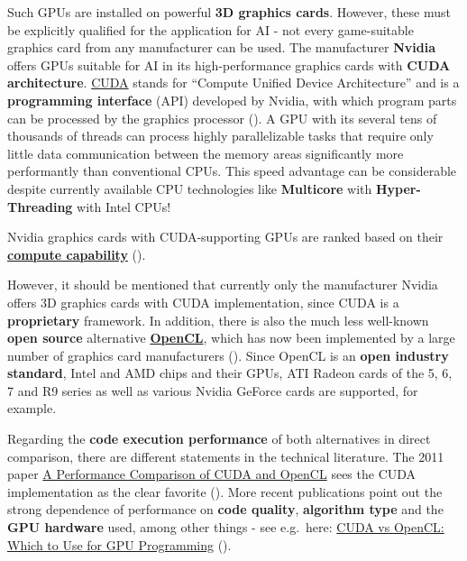 \documentclass [oneside,10pt,a4paper,ngerman,BCOR10mm,headsepline,parindent,final]{scrartcl}
\begin{document}
Such GPUs are installed on powerful \textbf{3D graphics cards}. However,
these must be explicitly qualified for the application for AI - not
every game-suitable graphics card from any manufacturer can be used. The
manufacturer \textbf{Nvidia} offers GPUs suitable for AI in its
high-performance graphics cards with \textbf{CUDA architecture}.
\href{https://en.wikipedia.org/wiki/CUDA}{CUDA} stands for ``Compute
Unified Device Architecture'' and is a \textbf{programming interface}
(API) developed by Nvidia, with which program parts can be processed by
the graphics processor (\cite{Wiki_CUDA}). A GPU with its several tens
of thousands of threads can process highly parallelizable tasks that
require only little data communication between the memory areas
significantly more performantly than conventional CPUs. This speed
advantage can be considerable despite currently available CPU
technologies like \textbf{Multicore} with \textbf{Hyper-Threading} with
Intel CPUs!

Nvidia graphics cards with CUDA-supporting GPUs are ranked based on
their \textbf{\href{https://developer.nvidia.com/cuda-gpus}{compute
capability}} (\cite{NVIDIA_CUDA_CAP_2022}).

However, it should be mentioned that currently only the manufacturer
Nvidia offers 3D graphics cards with CUDA implementation, since CUDA is
a \textbf{proprietary} framework. In addition, there is also the much
less well-known \textbf{open source} alternative
\textbf{\href{https://en.wikipedia.org/wiki/OpenCL}{OpenCL}}, which has
now been implemented by a large number of graphics card manufacturers
(\cite{Wiki_OpenCL}). Since OpenCL is an \textbf{open industry
standard}, Intel and AMD chips and their GPUs, ATI Radeon cards of the
5, 6, 7 and R9 series as well as various Nvidia GeForce cards are
supported, for example.

Regarding the \textbf{code execution performance} of both alternatives
in direct comparison, there are different statements in the technical
literature. The 2011 paper \href{https://arxiv.org/abs/1005.2581}{A
Performance Comparison of CUDA and OpenCL} sees the CUDA implementation
as the clear favorite (\cite{CUDA_OpenCL_Perf_2011}). More recent
publications point out the strong dependence of performance on
\textbf{code quality}, \textbf{algorithm type} and the \textbf{GPU
hardware} used, among other things - see e.g.~here:
\href{https://www.incredibuild.com/blog/cuda-vs-opencl-which-to-use-for-gpu-programming}{CUDA
vs OpenCL: Which to Use for GPU Programming}
(\cite{CUDA_vs_OpenCL_2021}).
\end{document}

